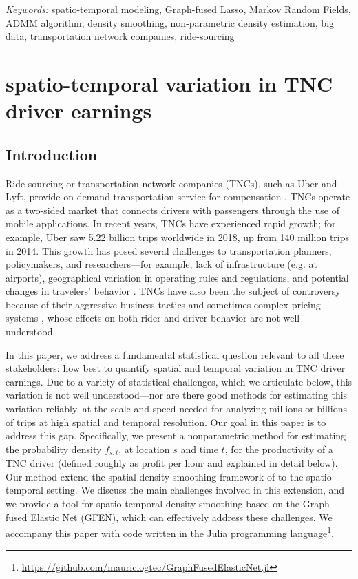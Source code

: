 \documentclass[a4paper, 11pt]{article}
\def\spacingset#1{\renewcommand{\baselinestretch}%
{#1}\small\normalsize} \spacingset{1.0} %
\begin{document}
\noindent%
{\it Keywords:}  spatio-temporal modeling, Graph-fused Lasso, Markov Random Fields, ADMM algorithm, density smoothing, non-parametric density estimation, big data, transportation network companies, ride-sourcing
\vfill

\newpage


\section{spatio-temporal variation in TNC driver earnings}

\label{sec:intro}

\subsection{Introduction} 

Ride-sourcing or transportation network companies (TNCs), such as Uber and Lyft, provide on-demand transportation service for compensation \citep{shaheen-2016}. TNCs operate as a two-sided market that connects drivers with passengers through the use of mobile applications. 
In recent years, TNCs have experienced rapid growth; for example, Uber saw 5.22 billion trips worldwide in 2018, up from 140 million trips in 2014.  
This growth has posed several challenges to transportation planners, policymakers, and researchers---for example, lack of infrastructure (e.g. at airports), geographical variation in operating rules and regulations, and potential changes in travelers' behavior \citep{smithuber}.  TNCs have also been the subject of controversy because of their aggressive business tactics and sometimes complex pricing systems \citep{li-2019}, whose effects on both rider and driver behavior are not well understood.  

In this paper, we address a fundamental statistical question relevant to all these stakeholders: how best to quantify spatial and temporal variation in TNC driver earnings.  Due to a variety of statistical challenges, which we articulate below, this variation is not well understood---nor are there good methods for estimating this variation reliably, at the scale and speed needed for analyzing millions or billions of trips at high spatial and temporal resolution.  Our goal in this paper is to address this gap.  Specifically, we present a nonparametric method for estimating the probability density $f_{s,t}$, at location $s$ and time $t$, for the productivity of a TNC driver (defined roughly as profit per hour and explained in detail below).   
Our method extend the spatial density smoothing framework of \citet{tansey-etal-2017} to the spatio-temporal setting. We discuss the main challenges involved in this extension, and we provide a tool for spatio-temporal density smoothing based on the Graph-fused Elastic Net (GFEN), which can effectively address these challenges.  We accompany this paper with code written in the Julia programming language\footnote{\url{https://github.com/mauriciogtec/GraphFusedElasticNet.jl}}.
\end{document}
